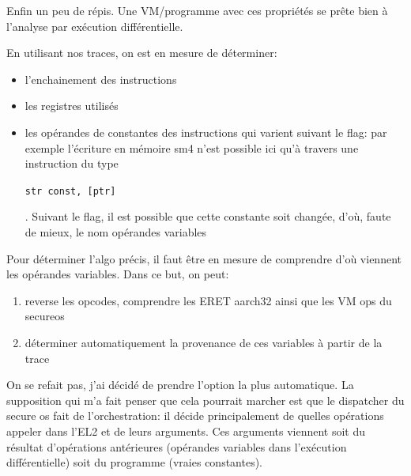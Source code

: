 \documentclass[14pt]{article}
\newcommand{\inlinebox}[2]{%
\colorbox{bg}{%
\parbox[b][0.6em]{\widthof{\texttt{#2}}}{\texttt{#2}}
}
}
\newcommand{\inlinetext}[1]{ \inlinebox{text}{#1} }
\theoremstyle{definition}
\begin{document}
\vspace*{\baselineskip}
Enfin un peu de répis. Une VM/programme avec ces propriétés se prête bien à l'analyse par exécution différentielle.

En utilisant nos traces, on est en mesure de déterminer:
\begin{itemize}
  \item l'enchainement des instructions
  \item les registres utilisés
  \item les opérandes de constantes des instructions qui varient suivant le flag: par exemple l'écriture en mémoire sm4 n'est possible ici qu'à travers une instruction du type \inlinetext{str const, [ptr]}. Suivant le flag, il est possible que cette constante soit changée, d'où, faute de mieux, le nom \og opérandes variables \fg

\end{itemize}

\vspace*{\baselineskip}

Pour déterminer l'algo précis, il faut être en mesure de comprendre d'où viennent les opérandes variables.
Dans ce but, on peut:
\begin{enumerate}
    \item reverse les opcodes, comprendre les ERET aarch32 ainsi que les VM ops du secureos
    \item déterminer automatiquement la provenance de ces variables à partir de la trace
\end{enumerate}

\vspace*{\baselineskip}
On se refait pas, j'ai décidé de prendre l'option la plus automatique.
La supposition qui m'a fait penser que cela pourrait marcher est que le dispatcher du secure os fait de l'orchestration: il décide principalement de quelles opérations appeler dans l'EL2 et de leurs arguments.
Ces arguments viennent soit du résultat d'opérations antérieures (opérandes variables dans l'exécution différentielle) soit du programme (vraies constantes).
\end{document}
